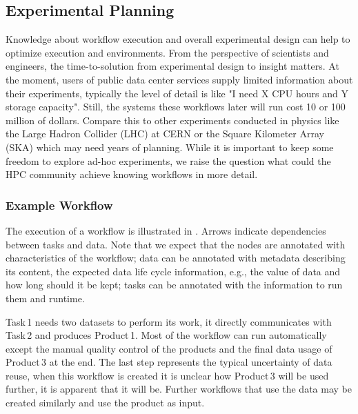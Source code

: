 \documentclass[a4paper, twocolumn]{article}
\begin{document}
\subsection{Experimental Planning}

Knowledge about workflow execution and overall experimental design can help to
optimize execution and environments.
From the perspective of scientists and engineers, the time-to-solution from experimental design to insight matters.
At the moment, users of public data center services supply limited information about their experiments, typically the level of detail is like "I need X CPU hours and Y storage capacity".
Still, the systems these workflows later will run cost 10 or 100 million of dollars.
Compare this to other experiments conducted in physics like the Large Hadron Collider (LHC) at CERN or the Square Kilometer Array (SKA) which may need years of planning.
While it is important to keep some freedom to explore ad-hoc experiments, we raise the question what could the HPC community achieve knowing workflows in more detail.

\subsubsection{Example Workflow}

The execution of a workflow is illustrated in .
Arrows indicate dependencies between tasks and data.
Note that we expect that the nodes are annotated with characteristics of the workflow;
data can be annotated with metadata describing its content, the expected data life cycle information, e.g., the value of data and how long should it be kept; tasks can be annotated with the information to run them and runtime.

Task\,1 needs two datasets to perform its work, it directly communicates with Task\,2 and produces Product\,1.
Most of the workflow can run automatically except the manual quality control of the products and the final data usage of Product\,3 at the end.
The last step represents the typical uncertainty of data reuse, when this workflow is created it is unclear how Product\,3 will be used further, it is apparent that it will be.
Further workflows that use the data may be created similarly and use the product as input.
\end{document}
